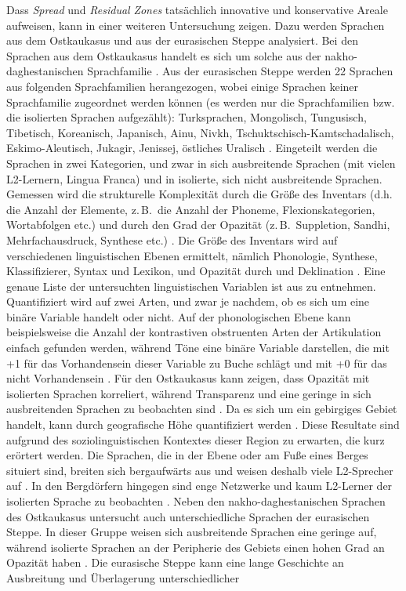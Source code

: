 Dass \textit{Spread} und \textit{Residual} \textit{Zones} tatsächlich innovative und konservative Areale aufweisen, kann \citet{Nichols2016} in einer weiteren Untersuchung zeigen. Dazu werden Sprachen aus dem Ostkaukasus und aus der eurasischen Steppe analysiert. Bei den Sprachen aus dem Ostkaukasus handelt es sich um solche aus der nakho-daghestanischen Sprachfamilie \citep[120--121]{Nichols2016}. Aus der eurasischen Steppe werden 22 Sprachen aus folgenden Sprachfamilien herangezogen, wobei einige Sprachen keiner Sprachfamilie zugeordnet werden können (es werden nur die Sprachfamilien bzw. die isolierten Sprachen aufgezählt): Turksprachen, Mongolisch, Tungusisch, Tibetisch, Koreanisch, Japanisch, Ainu, Nivkh, Tschuk\-tschisch-Kam\-tscha\-da\-lisch, Es\-ki\-mo-A\-leu\-tisch, Jukagir, Jenissej, östliches Uralisch \citep[129]{Nichols2016}. Eingeteilt werden die Sprachen in zwei Kategorien, und zwar in sich ausbreitende Sprachen (mit vielen L2-Ler\-nern, Lingua Franca) und in isolierte, sich nicht ausbreitende Sprachen. Gemessen wird die strukturelle Komplexität durch die Größe des Inventars (d.h. die Anzahl der Elemente, z.\,B.\ die Anzahl der Phoneme, Flexionskategorien, Wortabfolgen etc.) und durch den Grad der Opazität (z.\,B.\ Suppletion, Sandhi, Mehrfachausdruck, Synthese etc.) \citep[118]{Nichols2016}. Die Größe des Inventars wird auf verschiedenen linguistischen Ebenen ermittelt, nämlich Phonologie, Synthese, Klassifizierer, Syntax und Lexikon, und Opazität durch  und Deklination \citep[137]{Nichols2016}. Eine genaue Liste der untersuchten linguistischen Variablen ist aus \citet[137]{Nichols2016} zu entnehmen. Quantifiziert wird auf zwei Arten, und zwar je nachdem, ob es sich um eine binäre Variable handelt oder nicht. Auf der phonologischen Ebene kann beispielsweise die Anzahl der kontrastiven obstruenten Arten der Artikulation einfach gefunden werden, während Töne eine binäre Variable darstellen, die mit +1 für das Vorhandensein dieser Variable zu Buche schlägt und mit +0 für das nicht Vorhandensein \citep[137]{Nichols2016}. Für den Ostkaukasus kann \citet{Nichols2016} zeigen, dass Opazität mit isolierten Sprachen korreliert, während Transparenz und eine geringe  in sich ausbreitenden Sprachen zu beobachten sind \citep[129]{Nichols2016}. Da es sich um ein gebirgiges Gebiet handelt, kann  durch geografische Höhe quantifiziert werden \citep[129]{Nichols2016}. Diese Resultate sind aufgrund des soziolinguistischen Kontextes dieser Region zu erwarten, die kurz erörtert werden. Die Sprachen, die in der Ebene oder am Fuße eines Berges situiert sind, breiten sich bergaufwärts aus und weisen deshalb viele L2-Spre\-cher auf \citep[123--124]{Nichols2016}. In den Bergdörfern hingegen sind enge Netzwerke und kaum L2-Ler\-ner der isolierten Sprache zu beobachten \citep[123--124]{Nichols2016}. Neben den nakho-daghestanischen Sprachen des Ostkaukasus untersucht \citet{Nichols2016} auch unterschiedliche Sprachen der eurasischen Steppe. In dieser Gruppe weisen sich ausbreitende Sprachen eine geringe  auf, während isolierte Sprachen an der Peripherie des Gebiets einen hohen Grad an Opazität haben \citep[129--130]{Nichols2016}. Die eurasische Steppe kann eine lange Geschichte an Ausbreitung und Überlagerung unterschiedlicher 